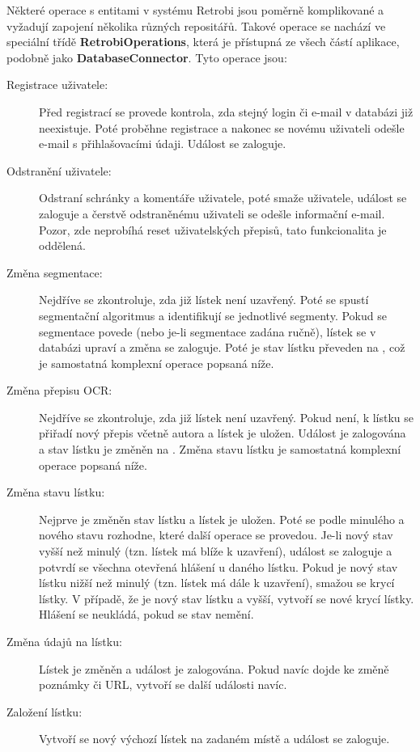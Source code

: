 Některé operace s entitami v systému Retrobi jsou poměrně komplikované a vyžadují zapojení několika různých repositářů. Takové operace se nachází ve speciální třídě {\bf RetrobiOperations}, která je přístupná ze všech částí aplikace, podobně jako {\bf DatabaseConnector}. Tyto operace jsou:

\begin{description}
\item[Registrace uživatele:]{Před registrací se provede kontrola, zda stejný login či e-mail v databázi již neexistuje. Poté proběhne registrace a nakonec se novému uživateli odešle e-mail s přihlašovacími údaji. Událost se zaloguje.}
\item[Odstranění uživatele:]{Odstraní schránky a komentáře uživatele, poté smaže uživatele, událost se zaloguje a čerstvě odstraněnému uživateli se odešle informační e-mail. Pozor, zde neprobíhá reset uživatelských přepisů, tato funkcionalita je oddělená.}
\item[Změna segmentace:]{Nejdříve se zkontroluje, zda již lístek není uzavřený. Poté se spustí segmentační algoritmus a identifikují se jednotlivé segmenty. Pokud se segmentace povede (nebo je-li segmentace zadána ručně), lístek se v databázi upraví a změna se zaloguje. Poté je stav lístku převeden na , což je samostatná komplexní operace popsaná níže.}
\item[Změna přepisu OCR:]{Nejdříve se zkontroluje, zda již lístek není uzavřený. Pokud není, k lístku se přiřadí nový přepis včetně autora a lístek je uložen. Událost je zalogována a stav lístku je změněn na . Změna stavu lístku je samostatná komplexní operace popsaná níže.}
\item[Změna stavu lístku:]{Nejprve je změněn stav lístku a lístek je uložen. Poté se podle minulého a nového stavu rozhodne, které další operace se provedou. Je-li nový stav vyšší než minulý (tzn. lístek má blíže k uzavření), událost se zaloguje a potvrdí se všechna otevřená hlášení u daného lístku. Pokud je nový stav lístku nižší než minulý (tzn. lístek má dále k uzavření), smažou se krycí lístky. V případě, že je nový stav lístku  a vyšší, vytvoří se nové krycí lístky. Hlášení se neukládá, pokud se stav nemění.}
\item[Změna údajů na lístku:]{Lístek je změněn a událost je zalogována. Pokud navíc dojde ke změně poznámky či URL, vytvoří se další události navíc.}
\item[Založení lístku:]{Vytvoří se nový výchozí lístek na zadaném místě a událost se zaloguje.}

\end{description}
